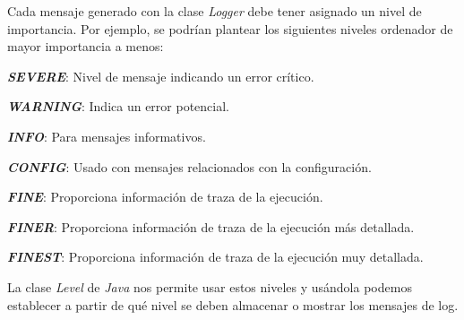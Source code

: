 Cada mensaje generado con la clase \textit{Logger} debe tener asignado un nivel de importancia. Por ejemplo, se podrían plantear los siguientes niveles ordenador de mayor importancia a menos\cite{Level_class_info}:
\begin{description}
\item \textbf{\textit{SEVERE}}: Nivel de mensaje indicando un error crítico.
\item \textbf{\textit{WARNING}}: Indica un error potencial.
\item \textbf{\textit{INFO}}: Para mensajes informativos.
\item \textbf{\textit{CONFIG}}: Usado con mensajes relacionados con la configuración.
\item \textbf{\textit{FINE}}: Proporciona información de traza de la ejecución.
\item \textbf{\textit{FINER}}: Proporciona información de traza de la ejecución más detallada.
\item \textbf{\textit{FINEST}}: Proporciona información de traza de la ejecución muy detallada.

La clase \textit{Level} de \textit{Java} nos permite usar estos niveles y usándola podemos establecer a partir de qué nivel se deben almacenar o mostrar los mensajes de log.

\end{description}

